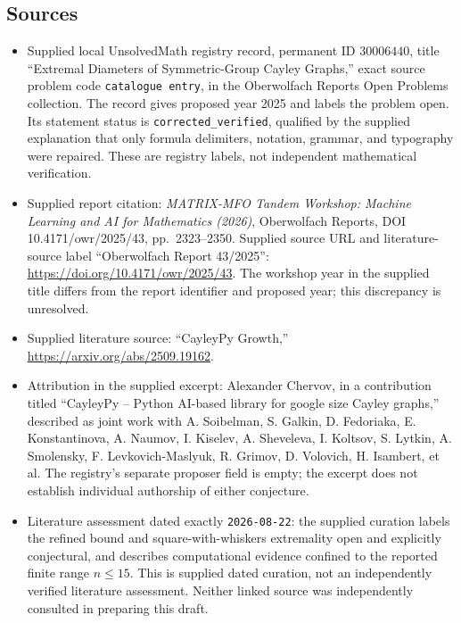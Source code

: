 \documentclass[11pt]{article}
\begin{document}
\subsection{Sources}
\begin{itemize}
\item Supplied local UnsolvedMath registry record, permanent ID \(30006440\), title ``Extremal Diameters of Symmetric-Group Cayley Graphs,'' exact source problem code \texttt{catalogue entry}, in the Oberwolfach Reports Open Problems collection. The record gives proposed year 2025 and labels the problem open. Its statement status is \texttt{corrected\_verified}, qualified by the supplied explanation that only formula delimiters, notation, grammar, and typography were repaired. These are registry labels, not independent mathematical verification.
\item Supplied report citation: \emph{MATRIX-MFO Tandem Workshop: Machine Learning and AI for Mathematics (2026)}, Oberwolfach Reports, DOI 10.4171/owr/2025/43, pp.\ 2323--2350. Supplied source URL and literature-source label ``Oberwolfach Report 43/2025'': \url{https://doi.org/10.4171/owr/2025/43}. The workshop year in the supplied title differs from the report identifier and proposed year; this discrepancy is unresolved.
\item Supplied literature source: ``CayleyPy Growth,'' \url{https://arxiv.org/abs/2509.19162}.
\item Attribution in the supplied excerpt: Alexander Chervov, in a contribution titled ``CayleyPy -- Python AI-based library for google size Cayley graphs,'' described as joint work with A. Soibelman, S. Galkin, D. Fedoriaka, E. Konstantinova, A. Naumov, I. Kiselev, A. Sheveleva, I. Koltsov, S. Lytkin, A. Smolensky, F. Levkovich-Maslyuk, R. Grimov, D. Volovich, H. Isambert, et al. The registry's separate proposer field is empty; the excerpt does not establish individual authorship of either conjecture.
\item Literature assessment dated exactly \texttt{2026-08-22}: the supplied curation labels the refined bound and square-with-whiskers extremality open and explicitly conjectural, and describes computational evidence confined to the reported finite range \(n\leq 15\). This is supplied dated curation, not an independently verified literature assessment. Neither linked source was independently consulted in preparing this draft.
\end{itemize}
\end{document}
